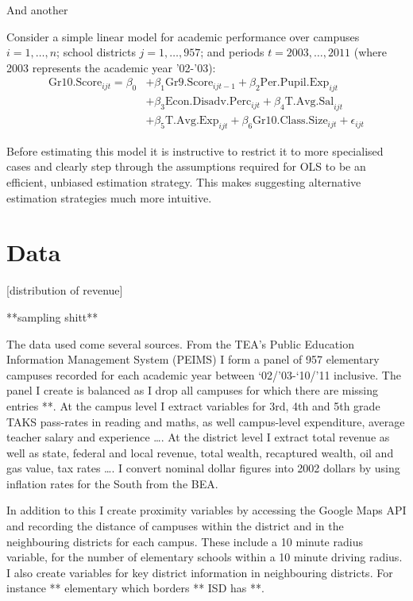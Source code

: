 \documentclass[11pt]{article}
\begin{document}
And another

Consider a simple linear model for academic performance over campuses $i=1,\ldots,n$; school districts $j=1,\ldots,957$; and periods $t=2003,\ldots,2011$ (where 2003 represents the academic year '02-'03):
\begin{align*}
\mathrm{Gr10.Score}_{ijt} = \beta_{0} 
    &+ \beta_{1}  \mathrm{Gr9.Score}_{ijt-1} 
    + \beta_{2}  \mathrm{Per.Pupil.Exp}_{ijt} \\
    &+ \beta_{3}  \mathrm{Econ.Disadv.Perc}_{ijt} 
    + \beta_{4}  \mathrm{T.Avg.Sal}_{ijt}  \\
    &+ \beta_{5}  \mathrm{T.Avg.Exp}_{ijt}  
    + \beta_{6}  \mathrm{Gr10.Class.Size}_{ijt} + \epsilon_{ijt}
\end{align*}


Before estimating this model it is instructive to restrict it to more specialised cases and clearly step through the assumptions required for OLS to be an efficient, unbiased estimation strategy. This makes suggesting alternative estimation strategies much more intuitive.

\section{Data}

[distribution of revenue]

**sampling shitt**

The data used come several sources. From the TEA’s Public Education Information Management System (PEIMS) I form a panel of 957 elementary campuses recorded for each academic year between ‘02/’03-‘10/’11 inclusive. The panel I create is balanced as I drop all campuses for which there are missing entries **.  At the campus level I extract variables for 3rd, 4th and 5th grade TAKS pass-rates in reading and maths, as well campus-level expenditure, average teacher salary and experience …. At the district level I extract total revenue as well as state, federal and local revenue, total wealth, recaptured wealth, oil and gas value, tax rates …. I convert nominal dollar figures into 2002 dollars by using inflation rates for the South from the BEA.

In addition to this I create proximity variables by accessing the Google Maps API and recording the distance of campuses within the district and in the neighbouring districts for each campus. These include a 10 minute radius variable, for the number of elementary schools within a 10 minute driving radius. I also create variables for key district information in neighbouring districts. For instance ** elementary which borders ** ISD has **.  
\end{document}
